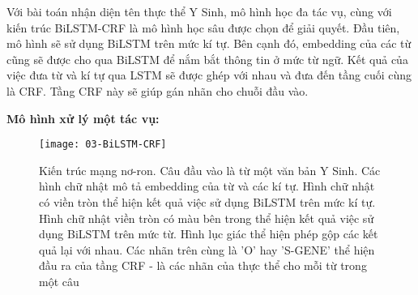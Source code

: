\documentclass[../main.tex]{subfiles}
\begin{document}
Với bài toán nhận diện tên thực thể Y Sinh, mô hình học đa tác vụ, cùng với kiến trúc BiLSTM-CRF là mô hình học sâu được chọn để giải quyết. Đầu tiên, mô hình sẽ sử dụng BiLSTM trên mức kí tự. Bên cạnh đó, embedding của các từ cũng sẽ được cho qua BiLSTM để nắm bắt thông tin ở mức từ ngữ. Kết quả của việc đưa từ và kí tự qua LSTM sẽ được ghép với nhau và đưa đến tầng cuối cùng là CRF. Tầng CRF này sẽ giúp gán nhãn cho chuỗi đầu vào. 

\textbf{Mô hình xử lý một tác vụ:
}
\begin{figure}[h]
\centering
\texttt{[image: 03-BiLSTM-CRF]}
\caption{Kiến trúc mạng nơ-ron. Câu đầu vào là từ một văn bản Y Sinh. Các hình chữ nhật mô tả embedding của từ và các kí tự. Hình chữ nhật có viền tròn thể hiện kết quả việc sử dụng BiLSTM trên mức kí tự. Hình chữ nhật viền tròn có màu bên trong thể hiện kết quả việc sử dụng BiLSTM trên mức từ. Hình lục giác thể hiện phép gộp các kết quả lại với nhau. Các nhãn trên cùng là 'O' hay 'S-GENE' thể hiện đầu ra của tầng CRF - là các nhãn của thực thể cho mỗi từ trong một câu}
\end{figure}
\end{document}
